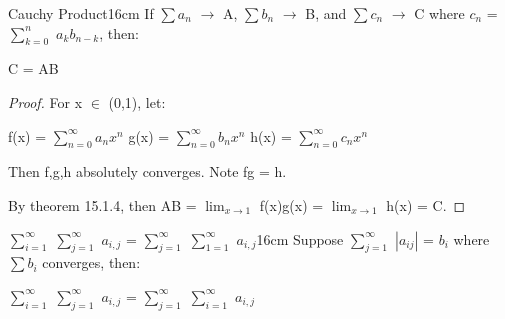     \newpage

    

    \begin{corollary}{Cauchy Product}{16cm}
        If $\sum a_n$ $\rightarrow$ A, $\sum b_n$ $\rightarrow$ B,
        and $\sum c_n$ $\rightarrow$ C where $c_n$ = $\sum_{k=0}^n$ $a_kb_{n-k}$,
        then:
        
        \hspace{0.5cm}
        C = AB
    \end{corollary}

    \begin{proof}
        For x $\in$ (0,1), let:
        
        \hspace{0.5cm}
        f(x) = $\sum_{n=0}^{\infty} a_n x^n$
        \hspace{1cm}
        g(x) = $\sum_{n=0}^{\infty} b_n x^n$
        \hspace{1cm}
        h(x) = $\sum_{n=0}^{\infty} c_n x^n$

        Then f,g,h absolutely converges.
        Note fg = h.
        
        By {\color{red} theorem 15.1.4}, then
        AB = $\lim_{x \rightarrow 1}$ f(x)g(x) = $\lim_{x \rightarrow 1}$ h(x) = C.
    \end{proof}

    \vspace{0.5cm}



    \begin{wtheorem}{$\sum_{i=1}^{\infty}$ $\sum_{j=1}^{\infty}$ $a_{i,j}$
    = $\sum_{j=1}^{\infty}$ $\sum_{1=1}^{\infty}$ $a_{i,j}$}{16cm}
        Suppose $\sum_{j=1}^{\infty}$ $|a_{ij}|$ = $b_i$ where $\sum b_i$
        converges, then:

        \hspace{0.5cm}
        $\sum_{i=1}^{\infty}$ $\sum_{j=1}^{\infty}$ $a_{i,j}$
        = $\sum_{j=1}^{\infty}$ $\sum_{i=1}^{\infty}$ $a_{i,j}$
    \end{wtheorem}

